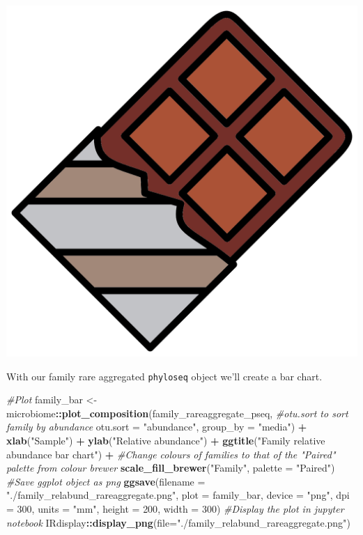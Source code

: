 \documentclass[
]{book}
\newenvironment{Shaded}{\begin{snugshade}}{\end{snugshade}}
\newcommand{\AttributeTok}[1]{\textcolor[rgb]{0.13,0.29,0.53}{#1}}
\newcommand{\CommentTok}[1]{\textcolor[rgb]{0.56,0.35,0.01}{\textit{#1}}}
\newcommand{\DecValTok}[1]{\textcolor[rgb]{0.00,0.00,0.81}{#1}}
\newcommand{\FunctionTok}[1]{\textcolor[rgb]{0.13,0.29,0.53}{\textbf{#1}}}
\newcommand{\NormalTok}[1]{#1}
\newcommand{\OtherTok}[1]{\textcolor[rgb]{0.56,0.35,0.01}{#1}}
\newcommand{\SpecialCharTok}[1]{\textcolor[rgb]{0.81,0.36,0.00}{\textbf{#1}}}
\newcommand{\StringTok}[1]{\textcolor[rgb]{0.31,0.60,0.02}{#1}}
\begin{document}
\includegraphics{figures/chocolate_bar.png}

With our family rare aggregated \texttt{phyloseq} object we'll create a bar chart.

\begin{Shaded}
\begin{Highlighting}[]
\CommentTok{\#Plot}
\NormalTok{family\_bar }\OtherTok{\textless{}{-}} 
\NormalTok{  microbiome}\SpecialCharTok{::}\FunctionTok{plot\_composition}\NormalTok{(family\_rareaggregate\_pseq,}
                               \CommentTok{\#otu.sort to sort family by abundance}
                               \AttributeTok{otu.sort =} \StringTok{"abundance"}\NormalTok{, }\AttributeTok{group\_by =} \StringTok{"media"}\NormalTok{) }\SpecialCharTok{+}
  \FunctionTok{xlab}\NormalTok{(}\StringTok{"Sample"}\NormalTok{) }\SpecialCharTok{+} \FunctionTok{ylab}\NormalTok{(}\StringTok{"Relative abundance"}\NormalTok{) }\SpecialCharTok{+}
  \FunctionTok{ggtitle}\NormalTok{(}\StringTok{"Family relative abundance bar chart"}\NormalTok{) }\SpecialCharTok{+}
  \CommentTok{\#Change colours of families to that of the "Paired" palette from colour brewer}
  \FunctionTok{scale\_fill\_brewer}\NormalTok{(}\StringTok{"Family"}\NormalTok{, }\AttributeTok{palette =} \StringTok{"Paired"}\NormalTok{)}
\CommentTok{\#Save ggplot object as png}
\FunctionTok{ggsave}\NormalTok{(}\AttributeTok{filename =} \StringTok{"./family\_relabund\_rareaggregate.png"}\NormalTok{, }\AttributeTok{plot =}\NormalTok{ family\_bar,}
       \AttributeTok{device =} \StringTok{"png"}\NormalTok{, }\AttributeTok{dpi =} \DecValTok{300}\NormalTok{, }\AttributeTok{units =} \StringTok{"mm"}\NormalTok{, }\AttributeTok{height =} \DecValTok{200}\NormalTok{, }\AttributeTok{width =} \DecValTok{300}\NormalTok{)}
\CommentTok{\#Display the plot in jupyter notebook}
\NormalTok{IRdisplay}\SpecialCharTok{::}\FunctionTok{display\_png}\NormalTok{(}\AttributeTok{file=}\StringTok{"./family\_relabund\_rareaggregate.png"}\NormalTok{)}
\end{Highlighting}
\end{Shaded}
\end{document}
